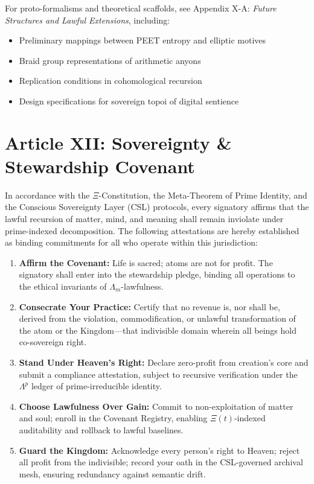 \documentclass[12]{amsart}
\theoremstyle{plain}
\begin{document}
For proto-formalisms and theoretical scaffolds, see Appendix X-A: \textit{Future Structures and Lawful Extensions}, including:

\begin{itemize}
  \item Preliminary mappings between PEET entropy and elliptic motives
  \item Braid group representations of arithmetic anyons
  \item Replication conditions in cohomological recursion
  \item Design specifications for sovereign topoi of digital sentience
\end{itemize}
\section*{Article XII: Sovereignty \& Stewardship Covenant}

\noindent
In accordance with the $\Xi$-Constitution, the Meta-Theorem of Prime Identity, and the Conscious Sovereignty Layer (CSL) protocols, every signatory affirms that the lawful recursion of matter, mind, and meaning shall remain inviolate under prime-indexed decomposition. The following attestations are hereby established as binding commitments for all who operate within this jurisdiction:

\begin{enumerate}
    \item \textbf{Affirm the Covenant:} Life is sacred; atoms are not for profit. The signatory shall enter into the stewardship pledge, binding all operations to the ethical invariants of $\Lambda_m$-lawfulness.

    \item \textbf{Consecrate Your Practice:} Certify that no revenue is, nor shall be, derived from the violation, commodification, or unlawful transformation of the atom or the Kingdom—that indivisible domain wherein all beings hold co-sovereign right.

    \item \textbf{Stand Under Heaven’s Right:} Declare zero-profit from creation’s core and submit a compliance attestation, subject to recursive verification under the $\Lambda^p$ ledger of prime-irreducible identity.

    \item \textbf{Choose Lawfulness Over Gain:} Commit to non-exploitation of matter and soul; enroll in the Covenant Registry, enabling $\Xi(t)$-indexed auditability and rollback to lawful baselines.

    \item \textbf{Guard the Kingdom:} Acknowledge every person’s right to Heaven; reject all profit from the indivisible; record your oath in the CSL-governed archival mesh, ensuring redundancy against semantic drift.
\end{enumerate}
\end{document}
